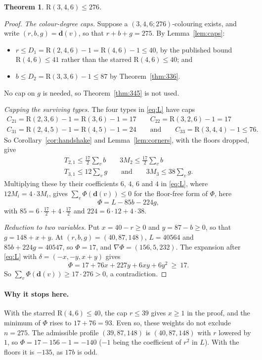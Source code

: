 \documentclass[11pt]{article}
\theoremstyle{spacedplain}
\newtheorem{theorem}{Theorem}[section]
\theoremstyle{spaceddef}
\theoremstyle{spacedremark}
\newcommand{\R}{\mathrm{R}}
\begin{document}
\begin{theorem}\label{thm:346}
$\R(3,4,6)\le 276$.
\end{theorem}

\begin{proof}
\emph{The colour-degree caps.}
Suppose a $(3,4,6;276)$-colouring exists, and write $(r,b,g)=\mathbf d(v)$, so that $r+b+g=275$.
By Lemma~\ref{lem:caps}:
\begin{itemize}
\item $r\le D_1=\R(2,4,6)-1=\R(4,6)-1\le 40$, by the published bound $\R(4,6)\le 41$ rather than the starred $\R(4,6)\le 40$; and
\item $b\le D_2=\R(3,3,6)-1\le 87$ by Theorem~\ref{thm:336}.
\end{itemize}
No cap on $g$ is needed, so Theorem~\ref{thm:345} is not used.

\emph{Capping the surviving types.}
The four types in \eqref{eq:L} have caps
\begin{gather*}
C_{21}=\R(2,3,6)-1=\R(3,6)-1=17\qquad C_{22}=\R(3,2,6)-1=17\\
C_{31}=\R(2,4,5)-1=\R(4,5)-1=24\qquad\text{and}\qquad C_{33}=\R(3,4,4)-1\le 76.
\end{gather*}
So Corollary~\ref{cor:handshake} and Lemma~\ref{lem:corners}, with the floors dropped, give
\begin{gather*}
T_{2,1}\le\frac{17}2\sum_v b\qquad 3M_2\le\frac{17}2\sum_v b\\
T_{3,1}\le 12\sum_v g\qquad\text{and}\qquad 3M_3\le 38\sum_v g.
\end{gather*}
Multiplying these by their coefficients $6$, $4$, $6$ and $4$ in \eqref{eq:L}, where $12M_i=4\cdot 3M_i$, gives $\sum_v\Phi(\mathbf d(v))\le 0$ for the floor-free form of $\Phi$, here
\[
\Phi=L-85b-224g,
\]
with $85=6\cdot\frac{17}2+4\cdot\frac{17}2$ and $224=6\cdot 12+4\cdot 38$.

\emph{Reduction to two variables.}
Put $x=40-r\ge 0$ and $y=87-b\ge 0$, so that $g=148+x+y$.
At $(r,b,g)=(40,87,148)$, $L=40564$ and $85b+224g=40547$, so $\Phi=17$, and $\nabla\Phi=(156,5,232)$.
The expansion after \eqref{eq:L} with $\delta=(-x,-y,x+y)$ gives
\[
\Phi=17+76x+227y+6xy+6y^2\ \ge\ 17 .
\]
So $\sum_v\Phi(\mathbf d(v))\ge 17\cdot 276>0$, a contradiction.
\end{proof}

\paragraph{Why it stops here.}
With the starred $\R(4,6)\le 40$, the cap $r\le 39$ gives $x\ge 1$ in the proof, and the minimum of $\Phi$ rises to $17+76=93$.
Even so, these weights do not exclude $n=275$.
The admissible profile $(39,87,148)$ is $(40,87,148)$ with $r$ lowered by $1$, so $\Phi=17-156-1=-140$ ($-1$ being the coefficient of $r^2$ in $L$).
With the floors it is $-135$, as $17b$ is odd.
\end{document}
